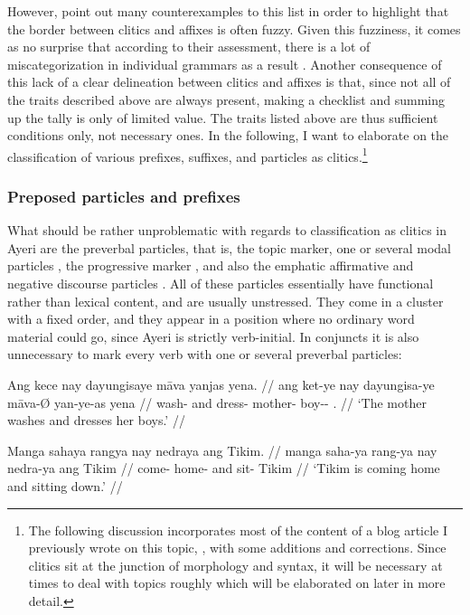However, \citet{spencerluis2012} point out many counterexamples to this list in
order to highlight that the border between clitics and affixes is often fuzzy.
Given this fuzziness, it comes as no surprise that according to their
assessment, there is a lot of miscategorization in individual grammars as a
result \citep[107]{spencerluis2012}. Another consequence of this lack of a
clear delineation between clitics and affixes is that, since not all of the
traits described above are always present, making a checklist and summing up
the tally is only of limited value. The traits listed above are thus sufficient
conditions only, not necessary ones. In the following, I want to elaborate on
the classification of various prefixes, suffixes, and particles as
clitics.\footnote{The following discussion incorporates most of the content of
a blog article I previously wrote on this topic, \citet{benung:clitics}, with
some additions and corrections. Since clitics sit at the junction of morphology
and syntax, it will be necessary at times to deal with topics roughly which
will be elaborated on later in more detail.}

\subsubsection{Preposed particles and prefixes}

What should be rather unproblematic with regards to classification as clitics
in Ayeri are the preverbal particles, that is, the topic  marker,
one or several modal particles , the progressive marker
, and also the emphatic affirmative and negative
discourse particles . All of these particles
essentially have functional rather than lexical content, and are usually
unstressed. They come in a cluster with a fixed order, and they appear in a
position where no ordinary word material could go, since Ayeri is strictly
verb-initial. In conjuncts it is also unnecessary to mark every verb with one
or several preverbal particles:

\pex
\a\label{ex:clitics_1a}\begingl
	\gla Ang kece nay dayungisaye māva yanjas yena. //
	\glb ang ket-ye nay dayungisa-ye māva-Ø yan-ye-as yena //
	\glc \AgtT{} wash-\TsgF{} and dress-\TsgF{} mother-\Top{} boy-\Pl{}-\Parg{}
		\TsgF{}.\Gen{} //
	\glft `The mother washes and dresses her boys.' //
\endgl

\a\label{ex:clitics_1b}\begingl
	\gla Manga sahaya rangya nay nedraya ang Tikim. //
	\glb manga saha-ya rang-ya nay nedra-ya ang Tikim //
	\glc \Prog{} come-\TsgM{} home-\Loc{} and sit-\TsgM{} \Aarg{} Tikim //
	\glft `Tikim is coming home and sitting down.' //
\endgl


